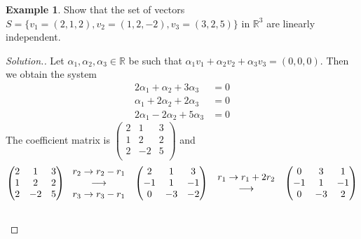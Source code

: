 \documentclass[11pt,a4paper]{article}
\theoremstyle{definition}
\newtheorem{exa}[thm]{Example}
\newenvironment{solution}
  {\renewcommand{\qedsymbol}{}\begin{proof}[\textit{Solution}.]}
  {\end{proof}}
\begin{document}
\begin{exa}
Show that the set of vectors $S=\{v_1=(2,1,2), v_2=(1,2,-2), v_3=(3,2,5)\}$ in $\mathbb{R}^3$ are linearly independent.
\end{exa}


\begin{solution}
Let $\alpha_1, \alpha_2, \alpha_3\in \mathbb{R}$ be such that $\alpha_1v_1+\alpha_2v_2+\alpha_3v_3=(0,0,0)$. Then we obtain the system
\begin{align*}
2\alpha_1+\alpha_2+3\alpha_3 &=0\\
\alpha_1+2\alpha_2+2\alpha_3 &=0\\
2\alpha_1-2\alpha_2+5\alpha_3 &=0
\end{align*}
The coefficient matrix is $
\begin{pmatrix}
2&1&3\\1&2&2\\2&-2&5\\
\end{pmatrix}
$ and
\begin{align*}
\begin{pmatrix}
2&1&3\\1&2&2\\2&-2&5\\
\end{pmatrix}
&\hspace{0.3cm}
\begin{matrix}
r_2\rightarrow r_2-r_1\\ \longrightarrow \\ r_3\rightarrow r_3-r_1\\
\end{matrix}
\hspace{0.3cm}
\begin{pmatrix}
2&1&3\\-1&1&-1\\0&-3&-2\\
\end{pmatrix}
\hspace{0.3cm}
\begin{matrix}
r_1\rightarrow r_1+2r_2\\ \longrightarrow\\
\end{matrix}
\hspace{0.3cm}
\begin{pmatrix}
0&3&1\\-1&1&-1\\0&-3&2\\
\end{pmatrix}\\\\

\end{align*}
\end{solution}
\end{document}

